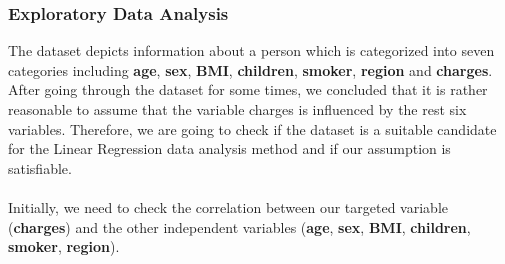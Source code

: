 \documentclass[a4paper]{article}
\begin{document}
\subsubsection{Exploratory Data Analysis}
The dataset depicts information about a person which is categorized into seven categories including \textbf{age}, \textbf{sex}, \textbf{BMI}, \textbf{children}, \textbf{smoker}, \textbf{region} and \textbf{charges}. After going through the dataset for some times, we concluded that it is rather reasonable to assume that the variable charges is influenced by the rest six variables. Therefore, we are going to check if the dataset is a suitable candidate for the Linear Regression data analysis method and if our assumption is satisfiable. \\ \\
Initially, we need to check the correlation between our targeted variable (\textbf{charges}) and the other independent variables (\textbf{age}, \textbf{sex}, \textbf{BMI}, \textbf{children}, \textbf{smoker}, \textbf{region}).
\newpage
\end{document}
